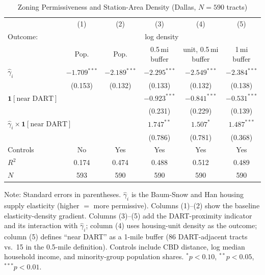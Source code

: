 \documentclass[12pt, a4paper]{article}
\theoremstyle{definition}
\begin{document}
\begin{table}[ht]
\centering
\caption{Zoning Permissiveness and Station-Area Density (Dallas, $N=590$ tracts)}
\label{tab:p2spec}
\begin{tabular}{lccccc}
\toprule
& (1) & (2) & (3) & (4) & (5) \\
Outcome: & \multicolumn{5}{c}{log density} \\
& Pop. & Pop. & 0.5\,mi buffer& unit, 0.5\,mi buffer& 1\,mi buffer \\
\midrule
$\hat\gamma_i$
  & $-1.709^{***}$ & $-2.189^{***}$ & $-2.295^{***}$ & $-2.549^{***}$ & $-2.384^{***}$ \\
  & (0.153) & (0.132) & (0.133) & (0.132) & (0.138) \\[3pt]
$\mathbf{1}[\text{near DART}]$
  & & & $-0.923^{***}$ & $-0.841^{***}$ & $-0.531^{***}$ \\
  & & & (0.231) & (0.229) & (0.139) \\[3pt]
$\hat\gamma_i \times \mathbf{1}[\text{near DART}]$
  & & & $1.747^{**}$ & $1.507^{*}$ & $1.487^{***}$ \\
  & & & (0.786) & (0.781) & (0.368) \\[3pt]
Controls & No & Yes & Yes & Yes & Yes \\
\midrule
$R^2$ & 0.174 & 0.474 & 0.488 & 0.512 & 0.489 \\
$N$ & 593 & 590 & 590 & 590 & 590 \\
\bottomrule
\end{tabular}
\begin{minipage}{0.97\textwidth}
\footnotesize Note: Standard errors in parentheses. $\hat\gamma_i$ is the Baum-Snow and Han housing supply elasticity (higher $=$ more permissive). Columns (1)--(2) show the baseline elasticity-density gradient. Columns (3)--(5) add the DART-proximity indicator and its interaction with $\hat\gamma_i$; column (4) uses housing-unit density as the outcome; column (5) defines ``near DART'' as a 1-mile buffer (86 DART-adjacent tracts vs.\ 15 in the 0.5-mile definition). Controls include CBD distance, log median household income, and minority-group population shares. $^{*}p<0.10$, $^{**}p<0.05$, $^{***}p<0.01$.
\end{minipage}
\end{table}
\end{document}
